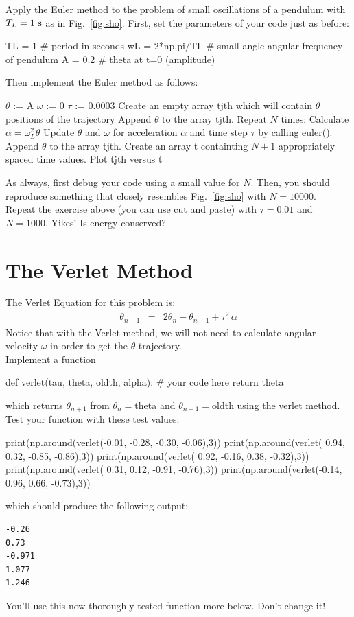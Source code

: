 \plot  Apply the Euler method to the problem of small oscillations of a pendulum with $T_L=1~\rm s$ as in Fig.~\ref{fig:sho}.  First, set the parameters of your code just as before:
\begin{python}
TL = 1          # period in seconds 
wL = 2*np.pi/TL # small-angle angular frequency of pendulum 
A  = 0.2        # theta at t=0 (amplitude)
\end{python}
Then implement the Euler method as follows:
\begin{algorithm}
  $\theta$ := A
  $\omega$ := 0
  $\tau$ := 0.0003
  Create an empty array tjth which will contain $\theta$ positions of the trajectory
  Append $\theta$ to the array tjth.
  Repeat $N$ times:
     Calculate $\alpha = \omega_L^2 \theta$
     Update $\theta$ and $\omega$ for acceleration $\alpha$ and time step $\tau$ by calling euler().
     Append $\theta$ to the array tjth.
  Create an array t containting $N+1$ appropriately spaced time values.
  Plot tjth versus t
\end{algorithm} 
As always, first debug your code using a small value for $N$.  Then,
you should reproduce something that closely resembles Fig.~\ref{fig:sho} with
$N=10000$. \\

\plot Repeat the exercise above (you can use cut and paste) with $\tau=0.01$ and $N=1000$.  Yikes!  Is energy conserved?\\

\section{The Verlet Method}

The Verlet Equation for this problem is:
\begin{eqnarray}
  \theta_{n+1} &=& 2 \theta_n - \theta_{n-1} + \tau^2 \, \alpha
\end{eqnarray}
Notice that with the Verlet method, we will not need to calculate angular
velocity $\omega$ in order to get the $\theta$ trajectory.\\

\plot Implement a function
\begin{python}
def verlet(tau, theta, oldth, alpha):
   # your code here
   return theta
\end{python}
which returns $\theta_{n+1}$ from $\theta_n=$theta and
$\theta_{n-1}=$oldth using the verlet method.
Test your  function with these test values:
\begin{python}
print(np.around(verlet(-0.01, -0.28, -0.30, -0.06),3))
print(np.around(verlet( 0.94,  0.32, -0.85, -0.86),3))
print(np.around(verlet( 0.92, -0.16,  0.38, -0.32),3))
print(np.around(verlet( 0.31,  0.12, -0.91, -0.76),3))
print(np.around(verlet(-0.14,  0.96,  0.66, -0.73),3))
\end{python}
which should produce the following output:
\begin{verbatim}
-0.26
0.73
-0.971
1.077
1.246
\end{verbatim}
You'll use this now thoroughly tested function more below.  Don't change it!\\

